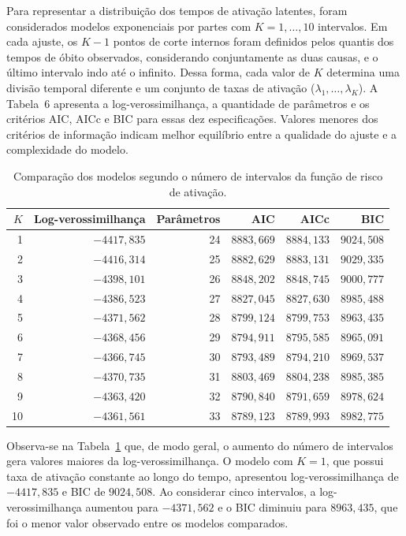 \documentclass[11pt,a4paper]{article}
\begin{document}
Para representar a distribuição dos tempos de ativação latentes, foram considerados modelos exponenciais por partes com $K=1,\ldots,10$ intervalos. Em cada ajuste, os $K-1$ pontos de corte internos foram definidos pelos quantis dos tempos de óbito observados, considerando conjuntamente as duas causas, e o último intervalo indo até o infinito. Dessa forma, cada valor de $K$ determina uma divisão temporal diferente e um conjunto de taxas de ativação ($\lambda_1,\ldots,\lambda_K$). A Tabela~6 apresenta a log-verossimilhança, a quantidade de parâmetros e os critérios AIC, AICc e BIC para essas dez especificações. Valores menores dos critérios de informação indicam melhor equilíbrio entre a qualidade do ajuste e a complexidade do modelo.

\begin{table}[H]
\centering
\sf
\setlength{\tabcolsep}{5pt}
\renewcommand{\arraystretch}{1.16}
\caption{Comparação dos modelos segundo o número de intervalos da função de risco de ativação.}
\label{tab:comparacao_k}
\begin{tabular}{@{}rrrrrr@{}}
\toprule
$K$ & Log-verossimilhança & Parâmetros & AIC & AICc & BIC \\
\midrule
1 & $-4417{,}835$ & 24 & $8883{,}669$ & $8884{,}133$ & $9024{,}508$ \\
2 & $-4416{,}314$ & 25 & $8882{,}629$ & $8883{,}131$ & $9029{,}335$ \\
3 & $-4398{,}101$ & 26 & $8848{,}202$ & $8848{,}745$ & $9000{,}777$ \\
4 & $-4386{,}523$ & 27 & $8827{,}045$ & $8827{,}630$ & $8985{,}488$ \\
5 & $-4371{,}562$ & 28 & $8799{,}124$ & $8799{,}753$ & \textbf{$8963{,}435$} \\
6 & $-4368{,}456$ & 29 & $8794{,}911$ & $8795{,}585$ & $8965{,}091$ \\
7 & $-4366{,}745$ & 30 & $8793{,}489$ & $8794{,}210$ & $8969{,}537$ \\
8 & $-4370{,}735$ & 31 & $8803{,}469$ & $8804{,}238$ & $8985{,}385$ \\
9 & $-4363{,}420$ & 32 & $8790{,}840$ & $8791{,}659$ & $8978{,}624$ \\
10 & $-4361{,}561$ & 33 & \textbf{$8789{,}123$} & \textbf{$8789{,}993$} & $8982{,}775$ \\
\bottomrule
\end{tabular}
\end{table}

Observa-se na Tabela~\ref{tab:comparacao_k} que, de modo geral, o aumento do número de intervalos gera valores maiores da log-verossimilhança. O modelo com $K=1$, que possui taxa de ativação constante ao longo do tempo, apresentou log-verossimilhança de $-4417{,}835$ e BIC de $9024{,}508$. Ao considerar cinco intervalos, a log-verossimilhança aumentou para $-4371{,}562$ e o BIC diminuiu para $8963{,}435$, que foi o menor valor observado entre os modelos comparados. 
\end{document}
